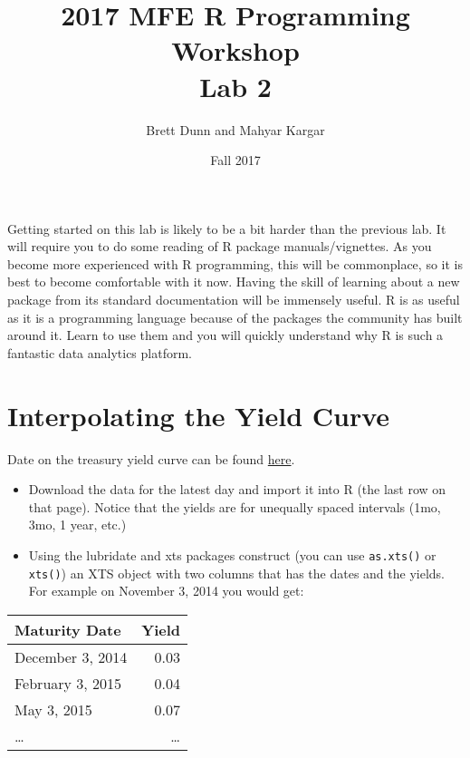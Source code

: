 \documentclass[12pt]{article}
\author{Brett Dunn and Mahyar Kargar}
\date{Fall 2017}
\title{2017 MFE R Programming Workshop\\
Lab 2}
\begin{document}


\maketitle
\onehalfspacing
Getting started on this lab is likely to be a bit harder than the
previous lab. It will require you to do some reading of R package
manuals/vignettes. As you become more experienced with R programming,
this will be commonplace, so it is best to become comfortable with it
now. Having the skill of learning about a new package from its
standard documentation will be immensely useful. R is as useful as it
is a programming language because of the packages the community has
built around it. Learn to use them and you will quickly understand why
R is such a fantastic data analytics platform.

\section*{Interpolating the Yield Curve}
\label{sec-1}
Date on the treasury yield curve can be found \href{http://www.treasury.gov/resource-center/data-chart-center/interest-rates/Pages/TextView.aspx?data=yield}{here}.


\begin{itemize}
\item Download the data for the latest day and import it into R (the last
row on that page). Notice that the yields are for unequally spaced
intervals (1mo, 3mo, 1 year, etc.)
\item Using the lubridate and xts packages construct (you can use \verb~as.xts()~
or \verb~xts()~) an XTS object with two columns that has the dates and
the yields. For example on November 3, 2014 you would get:
\end{itemize}

\begin{center}
\begin{tabular}{lr}
Maturity Date & Yield\\
\hline
December 3, 2014 & 0.03\\
February 3, 2015 & 0.04\\
May 3, 2015 & 0.07\\
\ldots{} & \ldots{}\\
\end{tabular}
\end{center}
\end{document}
